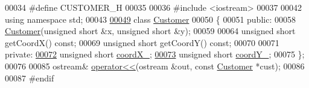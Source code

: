 \begin{DoxyCode}
00034 \textcolor{preprocessor}{}\textcolor{preprocessor}{#define CUSTOMER\_H}
00035 \textcolor{preprocessor}{}
00036 \textcolor{preprocessor}{#include <iostream>}
00037 
00042 \textcolor{keyword}{using namespace }std;
00043 
\hypertarget{Customer_8hpp_source_l00049}{}\hyperlink{classCustomer}{00049} \textcolor{keyword}{class }\hyperlink{classCustomer}{Customer}
00050 \{
00051 \textcolor{keyword}{public}:
00058     \hyperlink{classCustomer}{Customer}(\textcolor{keywordtype}{unsigned} \textcolor{keywordtype}{short} &x, \textcolor{keywordtype}{unsigned} \textcolor{keywordtype}{short} &y);
00059     
00064     \textcolor{keywordtype}{unsigned} \textcolor{keywordtype}{short} getCoordX() \textcolor{keyword}{const};
00069     \textcolor{keywordtype}{unsigned} \textcolor{keywordtype}{short} getCoordY() \textcolor{keyword}{const};
00070     
00071 \textcolor{keyword}{private}:
\hypertarget{Customer_8hpp_source_l00072}{}\hyperlink{classCustomer_a069ea07dbf810380271456fa45e54b48}{00072}     \textcolor{keywordtype}{unsigned} \textcolor{keywordtype}{short} \hyperlink{classCustomer_a069ea07dbf810380271456fa45e54b48}{coordX_};
\hypertarget{Customer_8hpp_source_l00073}{}\hyperlink{classCustomer_a752b743018cd6006ecb1d11d6bc6c6a7}{00073}     \textcolor{keywordtype}{unsigned} \textcolor{keywordtype}{short} \hyperlink{classCustomer_a752b743018cd6006ecb1d11d6bc6c6a7}{coordY_};
00075 \};
00076 
00085 ostream& \hyperlink{Customer_8cpp_a4f189076730c8c1b8ca5ab0a4db2476f}{operator<<}(ostream &out, \textcolor{keyword}{const} \hyperlink{classCustomer}{Customer} *cust);
00086 
00087 \textcolor{preprocessor}{#endif}
\end{DoxyCode}

